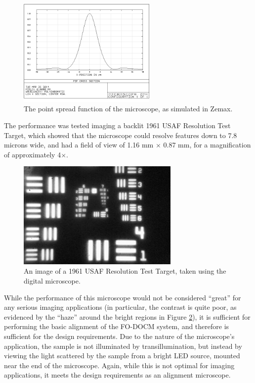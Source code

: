 \begin{figure}[h!]
\centering
\includegraphics[width=0.6\textwidth]{Images/Zemax/microscope_psf_2.png}
\caption[The point spread function of the microscope, as simulated in Zemax.]{The point spread function of the microscope, as simulated in Zemax.\label{fig:microscope_psf}}
\end{figure}

The performance was tested imaging a backlit 1961 USAF Resolution Test Target, which showed that the microscope could resolve features down to 7.8 microns wide, and had a field of view of 1.16 mm $\times$ 0.87 mm, for a magnification of approximately 4$\times$.

\begin{figure}[h!]
\centering
\includegraphics[width=0.7\textwidth]{Images/Microscope/target2.png}
\caption{An image of a 1961 USAF Resolution Test Target, taken using the digital microscope. \label{fig:usaf}}
\end{figure}

While the performance of this microscope would not be considered ``great'' for any serious imaging applications (in particular, the contrast is quite poor, as evidenced by the ``haze'' around the bright regions in Figure \ref{fig:usaf}), it is sufficient for performing the basic alignment of the FO-DOCM system, and therefore is sufficient for the design requirements. Due to the nature of the microscope's application, the sample is not illuminated by transillumination, but instead by viewing the light scattered by the sample from a bright LED source, mounted near the end of the microscope. Again, while this is not optimal for imaging applications, it meets the design requirements as an alignment microscope.

